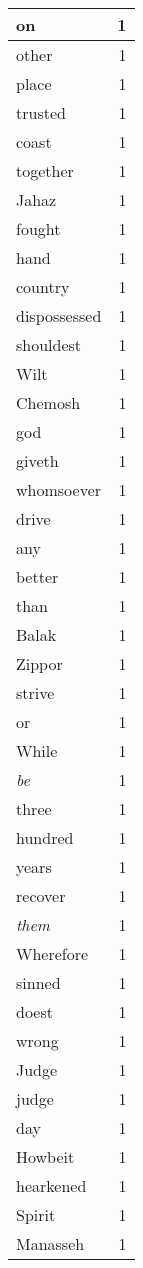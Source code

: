 \begin{center}
\begin{longtable}{l|r}
on & 1\\ \hline 
other & 1\\ \hline 
place & 1\\ \hline 
trusted & 1\\ \hline 
coast & 1\\ \hline 
together & 1\\ \hline 
Jahaz & 1\\ \hline 
fought & 1\\ \hline 
hand & 1\\ \hline 
country & 1\\ \hline 
dispossessed & 1\\ \hline 
shouldest & 1\\ \hline 
Wilt & 1\\ \hline 
Chemosh & 1\\ \hline 
god & 1\\ \hline 
giveth & 1\\ \hline 
whomsoever & 1\\ \hline 
drive & 1\\ \hline 
any & 1\\ \hline 
better & 1\\ \hline 
than & 1\\ \hline 
Balak & 1\\ \hline 
Zippor & 1\\ \hline 
strive & 1\\ \hline 
or & 1\\ \hline 
While & 1\\ \hline 
\emph{be} & 1\\ \hline 
three & 1\\ \hline 
hundred & 1\\ \hline 
years & 1\\ \hline 
recover & 1\\ \hline 
\emph{them} & 1\\ \hline 
Wherefore & 1\\ \hline 
sinned & 1\\ \hline 
doest & 1\\ \hline 
wrong & 1\\ \hline 
Judge & 1\\ \hline 
judge & 1\\ \hline 
day & 1\\ \hline 
Howbeit & 1\\ \hline 
hearkened & 1\\ \hline 
Spirit & 1\\ \hline 
Manasseh & 1\\ \hline 

\end{longtable}
\end{center}
